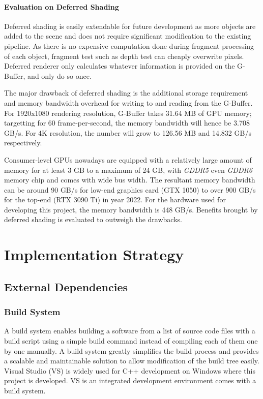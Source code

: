 \documentclass[oneside, a4paper]{report}
\begin{document}
    \subsubsection{Evaluation on Deferred Shading}

    Deferred shading is easily extendable for future development as more objects are added to the scene and does not require significant modification to the existing pipeline. As there is no expensive computation done during fragment processing of each object, fragment test such as depth test can cheaply overwrite pixels. Deferred renderer only calculates whatever information is provided on the G-Buffer, and only do so once.

    The major drawback of deferred shading is the additional storage requirement and memory bandwidth overhead for writing to and reading from the G-Buffer. For 1920x1080 rendering resolution, G-Buffer takes 31.64 MB of GPU memory; targetting for 60 frame-per-second, the memory bandwidth will hence be 3.708 GB/s. For 4K resolution, the number will grow to 126.56 MB and 14.832 GB/s respectively.

    Consumer-level GPUs nowadays are equipped with a relatively large amount of memory for at least 3 GB to a maximum of 24 GB, with \textit{GDDR5} even \textit{GDDR6} memory chip and comes with wide bus width. The resultant memory bandwidth can be around 90 GB/s for low-end graphics card (GTX 1050) to over 900 GB/s for the top-end (RTX 3090 Ti) in year 2022. For the hardware used for developing this project, the memory bandwidth is 448 GB/s. Benefits brought by deferred shading is evaluated to outweigh the drawbacks.

    \chapter{Implementation Strategy}

    \section{External Dependencies}

    \subsection{Build System}

    A build system enables building a software from a list of source code files with a build script using a simple build command instead of compiling each of them one by one manually. A build system greatly simplifies the build process and provides a scalable and maintainable solution to allow modification of the build tree easily. Visual Studio (VS) is widely used for C++ development on Windows where this project is developed. VS is an integrated development environment comes with a build system.
\end{document}
